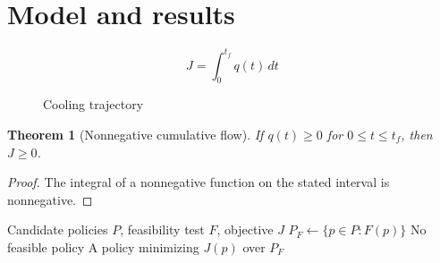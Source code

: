 \documentclass[12pt,a4paper]{article}
\newtheorem{theorem}{Theorem}[section]
\theoremstyle{definition}\newtheorem{definition}[theorem]{Definition}
\theoremstyle{remark}\newtheorem{remark}[theorem]{Remark}
\begin{document}
\section{Model and results}
\begin{equation}J=\int_0^{t_f} q(t)\,dt\end{equation}
\begin{figure}[htbp]\centering
{}
\caption{Cooling trajectory}\end{figure}

\begin{theorem}[Nonnegative cumulative flow]
If $q(t)\geq 0$ for $0\leq t\leq t_f$, then $J\geq 0$.
\end{theorem}
\begin{proof}
The integral of a nonnegative function on the stated interval is nonnegative.
\end{proof}
\begin{algorithm}[htbp]
\caption{Compare feasible candidate policies}
\begin{algorithmic}[1]
\Require Candidate policies $P$, feasibility test $F$, objective $J$
\State $P_F\gets\{p\in P:F(p)\}$
  \State \Return No feasible policy
\EndIf
\State \Return A policy minimizing $J(p)$ over $P_F$
\end{algorithmic}
\end{algorithm}
\end{document}
